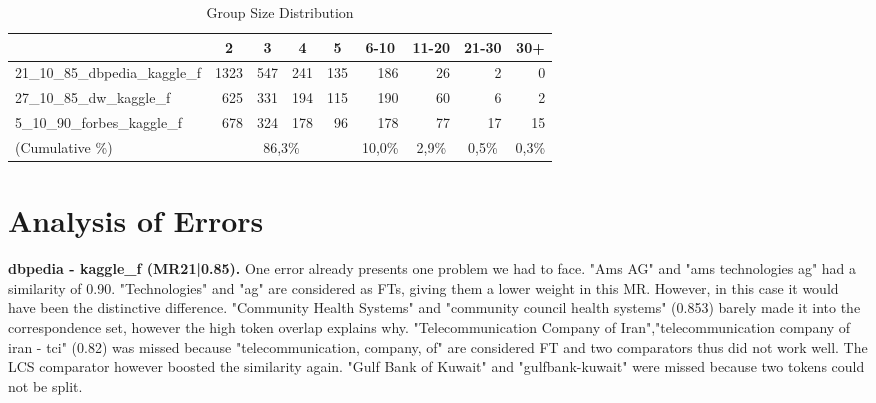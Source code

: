 \documentclass[11pt,titlepage,oneside,openany]{book}
\begin{document}
\begin{table}[]
	\centering
	\begin{tabular}{lllllllll}
		& \multicolumn{1}{c}{2}    & \multicolumn{1}{c}{3}   & \multicolumn{1}{c}{4}   & \multicolumn{1}{c}{5}   & \multicolumn{1}{c}{6-10}   & \multicolumn{1}{c}{11-20} & \multicolumn{1}{c}{21-30} & \multicolumn{1}{c}{30+}   \\\hline
		21\_10\_85\_dbpedia\_kaggle\_f & \multicolumn{1}{r}{1323} & \multicolumn{1}{r}{547} & \multicolumn{1}{r}{241} & \multicolumn{1}{r}{135} & \multicolumn{1}{r}{186}    & \multicolumn{1}{r}{26}    & \multicolumn{1}{r}{2}     & \multicolumn{1}{r}{0}     \\
		27\_10\_85\_dw\_kaggle\_f      & \multicolumn{1}{r}{625}  & \multicolumn{1}{r}{331} & \multicolumn{1}{r}{194} & \multicolumn{1}{r}{115} & \multicolumn{1}{r}{190}    & \multicolumn{1}{r}{60}    & \multicolumn{1}{r}{6}     & \multicolumn{1}{r}{2}     \\
		5\_10\_90\_forbes\_kaggle\_f   & \multicolumn{1}{r}{678}  & \multicolumn{1}{r}{324} & \multicolumn{1}{r}{178} & \multicolumn{1}{r}{96}  & \multicolumn{1}{r}{178}    & \multicolumn{1}{r}{77}    & \multicolumn{1}{r}{17}    & \multicolumn{1}{r}{15}    \\\hline
		(Cumulative \%)& \multicolumn{4}{c}{86,3\%}                                                                             & \multicolumn{1}{c}{10,0\%} & \multicolumn{1}{c}{2,9\%} & \multicolumn{1}{c}{0,5\%} & \multicolumn{1}{c}{0,3\%} \\                    
	\end{tabular}
\caption[Group Size Distribution]{Group Size Distribution}
\label{tab:group-size-dist}
\end{table}


\section{Analysis of Errors}
\label{sec:errors}
\textbf{dbpedia - kaggle\_f (MR21|0.85). } One error already presents one problem we had to face. "Ams AG" and "ams technologies ag" had a similarity of 0.90. "Technologies" and "ag" are considered as FTs, giving them a lower weight in this MR. However, in this case it would have been the distinctive difference. "Community Health Systems" and "community council health systems" (0.853) barely made it into the correspondence set, however the high token overlap explains why. "Telecommunication Company of Iran","telecommunication company of iran - tci" (0.82) was missed because "telecommunication, company, of" are considered FT and two comparators thus did not work well. The LCS comparator however boosted the similarity again. "Gulf Bank of Kuwait" and "gulfbank-kuwait" were missed because two tokens could not be split.
\end{document}
